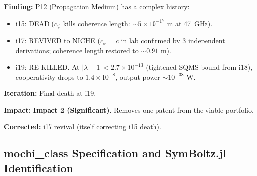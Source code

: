 \documentclass[11pt,a4paper]{article}
\newcommand{\imptwo}{\textcolor{impact2}{\textbf{Impact 2 (Significant)}}}
\newcommand{\ee}[1]{\times 10^{#1}}
\begin{document}
\begin{tcolorbox}[colback=green!5!white, colframe=green!50!black,
  title=\textbf{P12 Death $\to$ Revival $\to$ Death --- Iterations 15--19}]

\textbf{Finding:} P12 (Propagation Medium) has a complex history:
\begin{itemize}
  \item i15: DEAD ($c_\psi$ kills coherence length: $\sim 5\ee{-17}$ m
    at 47~GHz).
  \item i17: REVIVED to NICHE ($c_\psi = c$ in lab confirmed by 3
    independent derivations; coherence length restored to $\sim 0.91$ m).
  \item i19: RE-KILLED. At $|\lambda - 1| < 2.7\ee{-13}$ (tightened
    SQMS bound from i18), cooperativity drops to $1.4\ee{-8}$, output
    power $\sim 10^{-38}$ W.
\end{itemize}

\textbf{Iteration:} Final death at i19.

\textbf{Impact:} \imptwo. Removes one patent from the viable portfolio.

\textbf{Corrected:} i17 revival (itself correcting i15 death).

\end{tcolorbox}

\subsection{mochi\_class Specification and SymBoltz.jl Identification}
\label{sec:boltzmann}
\end{document}
